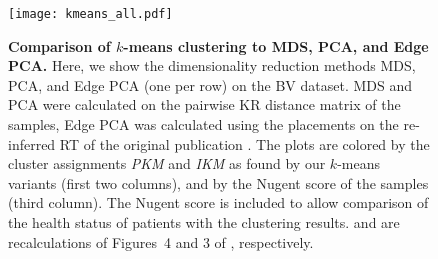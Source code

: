 \begin{figure}[!htpb]
    \centering
    \texttt{[image: kmeans\_all.pdf]}
    \begin{subfigure}{0pt}
        \label{fig:kmeans_all:sub:mds_em}
    \end{subfigure}
    \begin{subfigure}{0pt}
        \label{fig:kmeans_all:sub:mds_ei}
    \end{subfigure}
    \begin{subfigure}{0pt}
        \label{fig:kmeans_all:sub:mds_ns}
    \end{subfigure}
    \begin{subfigure}{0pt}
        \label{fig:kmeans_all:sub:pca_em}
    \end{subfigure}
    \begin{subfigure}{0pt}
        \label{fig:kmeans_all:sub:pca_ei}
    \end{subfigure}
    \begin{subfigure}{0pt}
        \label{fig:kmeans_all:sub:pca_ns}
    \end{subfigure}
    \begin{subfigure}{0pt}
        \label{fig:kmeans_all:sub:epca_em}
    \end{subfigure}
    \begin{subfigure}{0pt}
        \label{fig:kmeans_all:sub:epca_ei}
    \end{subfigure}
    \begin{subfigure}{0pt}
        \label{fig:kmeans_all:sub:epca_ns}
    \end{subfigure}
    \caption[Comparison of $k$-means clustering to MDS, PCA, and Edge PCA]{
        \textbf{Comparison of $k$-means clustering to MDS, PCA, and Edge PCA.}
        Here, we show the dimensionality reduction methods MDS, PCA, and Edge PCA (one per row) on the \ac{BV} dataset.
        MDS and PCA were calculated on the pairwise KR distance matrix of the samples,
        Edge PCA was calculated using the placements on the re-inferred \ac{RT} of the original publication \cite{Srinivasan2012}.
        The plots are colored by the cluster assignments \emph{PKM} and \emph{IKM}
        as found by our $k$-means variants (first two columns), and by the Nugent score of the samples (third column).
        The Nugent score is included to allow comparison of the health status of patients with the clustering results.
         and  are recalculations of
        Figures~4 and 3 of \cite{Matsen2011b}, respectively.
    }
    \label{fig:kmeans_all}
\end{figure}

